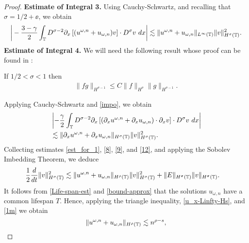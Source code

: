 \begin{proof}
\textbf{Estimate of Integral 3.} Using Cauchy-Schwartz, and recalling that
$\sigma = 1/2 + \ee$,  we obtain
%
%
\begin{equation}
\begin{split}
\bigg | -\frac{3-\gamma}{2} \int_{\mathbb{T}} D^{\sigma -2} \partial_x \left[
(u^{\omega,n} + u_{\omega,n})v \right]
\cdot D^\sigma v \ dx \bigg |
\lesssim \|u^{\omega,n} + u_{\omega,n} \|_{L^\infty(\mathbb{T})} 
\|v\|_{H^\sigma(\mathbb{T})}^2.
\label{9}
\end{split}
\end{equation}
%
%
%
\textbf{Estimate of Integral 4.}
We will need the following result whose proof can be found in 
\cite{Himonas_2009_Non-uniform-dep-per}:
%
%
%
\begin{lemma}
\label{impo}
If  $1/2 < \sigma < 1 $ then
%
%
\begin{equation}
\begin{split}
\|fg\|_{H^{\sigma - 1}} \le C \|f\|_{H^{\sigma}}
\|g\|_{H^{\sigma -1}}.
\label{11}
\end{split}
\end{equation}
%
%
\end{lemma}
%
Applying Cauchy-Schwartz and  \cref{impo}, we obtain
%
%
\begin{equation}
\begin{split}
& \left | -\frac{\gamma}{2} \int_{\mathbb{T}} D^{\sigma -2 } \partial_x \left[
\left( \partial_x u^{\omega,n} + \partial_x u_{\omega,n} \right) \cdot \partial_x v
\right] \cdot D^\sigma v \ dx \right |
\\
& \lesssim \|\partial_x u^{\omega,n} + \partial_x u_{\omega,n}
\|_{H^\sigma(\mathbb{T})} \|v\|_{H^\sigma(\mathbb{T})}^2.
\label{12}
\end{split}
\end{equation}
%
%
Collecting estimates \eqref{est_for_1}, \eqref{8}, \eqref{9}, and
\eqref{12}, and applying the Sobolev Imbedding Theorem, we deduce
%
%
\begin{equation}
\begin{split}
\frac{1}{2}\frac{d}{dt} \|v\|_{H^\sigma(\mathbb{T})}^2
& \lesssim
\|u^{\omega,n} + u_{\omega,n}\|_{H^{\rho}(\mathbb{T})} \|v\|_{H^\sigma(\mathbb{T})}^2
+ \|E\|_{H^\sigma(\mathbb{T})}
\|v\|_{H^\sigma(\mathbb{T})}.
\label{10}
\end{split}
\end{equation}
%
%
It follows from \eqref{Life-span-est} and 
\eqref{bound-approx} that the solutions $u_{\omega,n}$ have a common 
lifespan $T$. Hence, applying the triangle inequality, 
\eqref{u_x-Linfty-Hs}, and \eqref{1m} we obtain  
%
%
\begin{equation}
\|u^{\omega,n} + u_{\omega,n}\|_{H^\rho(\ci)} \lesssim n^{\rho -s}, 

\end{equation}
\end{proof}
